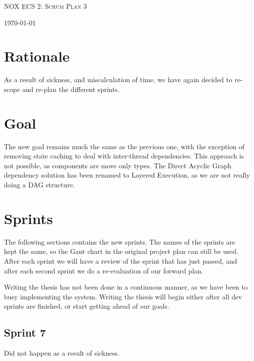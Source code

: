 \documentclass[hidelinks]{article}
\begin{document}
\begin{titlepage}
    \centering
    {\scshape\LARGE NOX ECS 2: Scrum Plan 3 \par}
    \vfill
    {\large \today\par}
\end{titlepage}

\tableofcontents
\pagebreak

\section{Rationale}
As a result of sickness, and miscalculation of time, we have again decided to re-scope and re-plan the different sprints.

\section{Goal}
The new goal remains much the same as the previous one, with the exception of removing state caching to deal with inter-thread dependencies.
This approach is not possible, as components are move only types. 
The Direct Acyclic Graph dependency solution has been renamed to Layered Execution, as we are not really doing a DAG structure.

\section{Sprints}
The following sections contains the new sprints. The names of the sprints are kept the same, so the Gant chart in the original project plan can still be used.
After each sprint we will have a review of the sprint that has just passed, and after each second sprint we do a re-evaluation of our forward plan.

Writing the thesis has not been done in a continuous manner, as we have been to busy implementing the system. 
Writing the thesis will begin either after all dev sprints are finished, or start getting ahead of our goals.

\subsection{Sprint 7}
Did not happen as a result of sickness.
\end{document}
